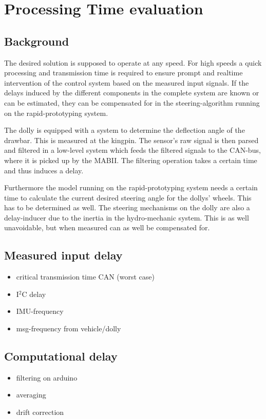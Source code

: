 \documentclass[ExampleMasters.tex]{subfiles}
\begin{document}
\clearpage
\chapter{Processing Time evaluation}
\label{chap:processing_time_delay}
\section{Background}
The desired solution is supposed to operate at any speed. For high speeds a quick processing and transmission time is required to ensure prompt and realtime intervention of the control system based on the measured input signals. If the delays induced by the different components in the complete system are known or can be estimated, they can be compensated for in the steering-algorithm running on the rapid-prototyping system.

The dolly is equipped with a system to determine the deflection angle of the drawbar. This is measured at the kingpin. The sensor's raw signal is then parsed and filtered in a low-level system which feeds the filtered signals to the CAN-bus, where it is picked up by the MABII. The filtering operation takes a certain time and thus induces a delay. 

Furthermore the model running on the rapid-prototyping system needs a certain time to calculate the current desired steering angle for the dollys' wheels. This has to be determined as well. The steering mechanisms on the dolly are also a delay-inducer due to the inertia in the hydro-mechanic system. This is as well unavoidable, but when measured can as well be compensated for. 


\section{Measured input delay}
\label{sec:measuring_delay}
\begin{itemize}
	\item critical transmission time CAN (worst case)
	\item I$^2$C delay
	\item IMU-frequency
	\item msg-frequency from vehicle/dolly
	
\end{itemize}

\section{Computational delay}
\label{sec:computational_delay}
\begin{itemize}
	\item filtering on arduino
	\item averaging
	\item drift correction
	
\end{itemize}
\end{document}
